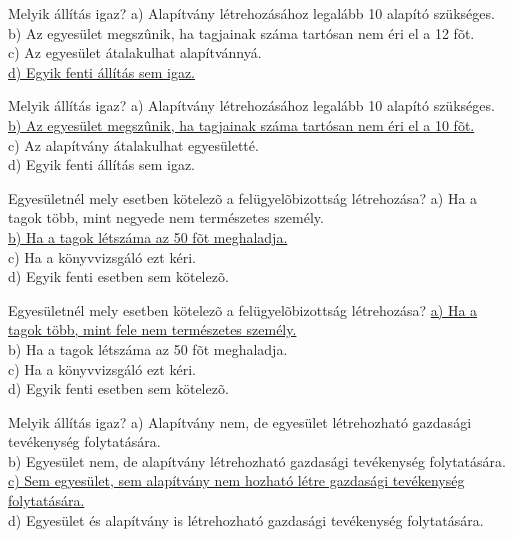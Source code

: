 \begin{frame}

\begin{tcolorbox}[title={55. Kérdés}]
Melyik állítás igaz?
\tcblower
a) Alapítvány létrehozásához legalább 10 alapító szükséges.\\
b) Az egyesület megszûnik, ha tagjainak száma tartósan nem éri el a 12 fõt.\\
c) Az egyesület átalakulhat alapítvánnyá.\\
\uline {d) Egyik fenti állítás sem igaz.}
\end{tcolorbox}

\begin{tcolorbox}[title={56. Kérdés}]
Melyik állítás igaz?
\tcblower
a) Alapítvány létrehozásához legalább 10 alapító szükséges.\\
\uline {b) Az egyesület megszûnik, ha tagjainak száma tartósan nem éri el a 10 fõt.}\\
c) Az alapítvány átalakulhat egyesületté.\\
d) Egyik fenti állítás sem igaz.
\end{tcolorbox}

\begin{tcolorbox}[title={57. Kérdés}]
Egyesületnél mely esetben kötelezõ a felügyelõbizottság létrehozása?
\tcblower
a) Ha a tagok több, mint negyede nem természetes személy.\\
\uline {b) Ha a tagok létszáma az 50 fõt meghaladja.}\\
c) Ha a könyvvizsgáló ezt kéri.\\
d) Egyik fenti esetben sem kötelezõ.
\end{tcolorbox}

\begin{tcolorbox}[title={58. Kérdés}]
Egyesületnél mely esetben kötelezõ a felügyelõbizottság létrehozása?
\tcblower
\uline {a) Ha a tagok több, mint fele nem természetes személy.}\\
b) Ha a tagok létszáma az 50 fõt meghaladja.\\
c) Ha a könyvvizsgáló ezt kéri.\\
d) Egyik fenti esetben sem kötelezõ.
\end{tcolorbox}

\end{frame}


\begin{frame}

\begin{tcolorbox}[title={59. Kérdés}]
Melyik állítás igaz?
\tcblower
a) Alapítvány nem, de egyesület létrehozható gazdasági tevékenység folytatására.\\
b) Egyesület nem, de alapítvány létrehozható gazdasági tevékenység folytatására.\\
\uline {c) Sem egyesület, sem alapítvány nem hozható létre gazdasági tevékenység folytatására.}\\
d) Egyesület és alapítvány is létrehozható gazdasági tevékenység folytatására.
\end{tcolorbox}

\end{frame}

